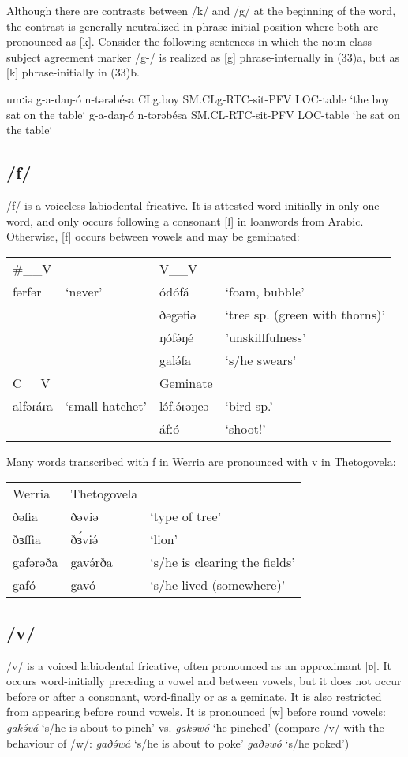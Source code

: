 Although there are contrasts between /k/ and /g/ at the beginning of the word, the contrast is generally neutralized in phrase-initial position where both are pronounced as [k]. Consider the following sentences in which the noun class subject agreement marker /g-/ is realized as [g] phrase-internally in (33)a, but as [k] phrase-initially in (33)b.

\ea {}
	umːiə  	g-a-daŋ-ó          	n-tərəbésa
	CLg.boy       SM.CLg-RTC-sit-PFV	LOC-table
	‘the boy sat on the table‘
		g-a-daŋ-ó	n-tərəbésa
		SM.CL-RTC-sit-PFV	LOC-table
     	‘he sat on the table‘
\z \z 

\subsection{/f/}
/f/ is a voiceless labiodental fricative. It is attested word-initially in only one word, and only occurs following a consonant [l] in loanwords from Arabic. Otherwise, [f] occurs between vowels and may be geminated:

\ea	
\begin{tabular}[t]{llll}
\#\_\_V	&&	V\_\_V	\\
fərfər	&‘never’	&ódófá	&‘foam, bubble’\\
					&&ðəgəfiə		&‘tree sp. (green with thorns)’\\
					&&ŋófə́ŋé		&’unskillfulness’\\
					&&galə́fa		&‘s/he swears’\\
\midrule			
C\_\_V	&&		Geminate	\\
\midrule
alfəɾáɾa	&‘small hatchet’		&lə́fːə́ɾəŋeə	&‘bird sp.’\\
								&&áfːó		&‘shoot!’
\end{tabular}\label{ex:ch2:26}
\z

Many words transcribed with f in Werria are pronounced with v in Thetogovela:

\ea 	
\begin{tabular}[t]{lll}
	Werria	& Thetogovela\\
	ðəfia		&ðəviə	&‘type of tree’\\
	ðɜffia		&ðɜ́viə́	&‘lion’\\
	gafərəða	&gavə́rða	&‘s/he is clearing the fields’\\
	gafó		&gavó	&‘s/he lived (somewhere)’		
\end{tabular}\label{ex:ch2:27}
\z 

\subsection{/v/}\label{section:v}	
/v/ is a voiced labiodental fricative, often pronounced as an approximant [ʋ]. It occurs word-initially preceding a vowel and between vowels, but it does not occur before or after a consonant, word-finally or as a geminate. It is also restricted from appearing before round vowels. It is pronounced [w] before round vowels:  \textit{gakə́vá} ‘s/he is about to pinch’ vs. \textit{gakəwó} ‘he pinched’ (compare /v/ with the behaviour of /w/: \textit{gaðə́wá} ‘s/he is about to poke’ \textit{gaðəwó} ‘s/he poked’)

